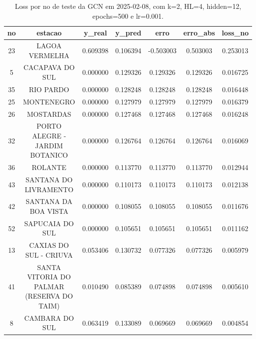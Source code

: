 \begin{table}[h]
\centering
\caption{Loss por no de teste da GCN em 2025-02-08, com k=2, HL=4, hidden=12, epochs=500 e lr=0.001.}
\label{tab:gcn_loss_k2_hl4_h12_e500_d20250208}
\begin{tabular}{ccccccc}
\toprule
no & estacao & y\_real & y\_pred & erro & erro\_abs & loss\_no \\
\midrule
23 & LAGOA VERMELHA & 0.609398 & 0.106394 & -0.503003 & 0.503003 & 0.253013 \\
5 & CACAPAVA DO SUL & 0.000000 & 0.129326 & 0.129326 & 0.129326 & 0.016725 \\
35 & RIO PARDO & 0.000000 & 0.128248 & 0.128248 & 0.128248 & 0.016448 \\
25 & MONTENEGRO & 0.000000 & 0.127979 & 0.127979 & 0.127979 & 0.016379 \\
26 & MOSTARDAS & 0.000000 & 0.127468 & 0.127468 & 0.127468 & 0.016248 \\
32 & PORTO ALEGRE - JARDIM BOTANICO & 0.000000 & 0.126764 & 0.126764 & 0.126764 & 0.016069 \\
36 & ROLANTE & 0.000000 & 0.113770 & 0.113770 & 0.113770 & 0.012944 \\
43 & SANTANA DO LIVRAMENTO & 0.000000 & 0.110173 & 0.110173 & 0.110173 & 0.012138 \\
42 & SANTANA DA BOA VISTA & 0.000000 & 0.108055 & 0.108055 & 0.108055 & 0.011676 \\
52 & SAPUCAIA DO SUL & 0.000000 & 0.105651 & 0.105651 & 0.105651 & 0.011162 \\
13 & CAXIAS DO SUL - CRIUVA & 0.053406 & 0.130732 & 0.077326 & 0.077326 & 0.005979 \\
41 & SANTA VITORIA DO PALMAR (RESERVA DO TAIM) & 0.010490 & 0.085389 & 0.074898 & 0.074898 & 0.005610 \\
8 & CAMBARA DO SUL & 0.063419 & 0.133089 & 0.069669 & 0.069669 & 0.004854 \\
\bottomrule
\end{tabular}
\end{table}

